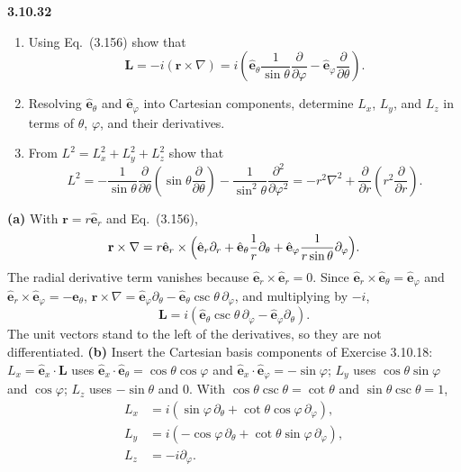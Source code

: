 \par\bigskip
\noindent\textbf{3.10.32}\quad
\begin{enumerate}
\item[(a)] Using Eq.~(3.156) show that
  \[
  \mathbf{L}=-i(\mathbf{r}\times\nabla)
  =i\left(\hat{\mathbf{e}}_{\theta}\frac{1}{\sin\theta}\frac{\partial}
  {\partial\varphi}-\hat{\mathbf{e}}_{\varphi}\frac{\partial}{\partial\theta}
  \right).
  \]
\item[(b)] Resolving $\hat{\mathbf{e}}_{\theta}$ and
  $\hat{\mathbf{e}}_{\varphi}$ into Cartesian components, determine $L_{x}$,
  $L_{y}$, and $L_{z}$ in terms of $\theta$, $\varphi$, and their derivatives.
\item[(c)] From $L^{2}=L_{x}^{2}+L_{y}^{2}+L_{z}^{2}$ show that
  \[
  L^{2}=-\frac{1}{\sin\theta}\frac{\partial}{\partial\theta}
  \left(\sin\theta\frac{\partial}{\partial\theta}\right)
  -\frac{1}{\sin^{2}\theta}\frac{\partial^{2}}{\partial\varphi^{2}}
  =-r^{2}\nabla^{2}+\frac{\partial}{\partial r}\left(r^{2}\frac{\partial}
  {\partial r}\right).
  \]
\end{enumerate}
\solution
\textbf{(a)} With $\mathbf r=r\hat{\mathbf e}_r$ and Eq.~(3.156),
\[
\mathbf r\times\nabla=r\hat{\mathbf e}_r\times\Bigl(\hat{\mathbf e}_r\partial_r
+\hat{\mathbf e}_\theta\frac1r\partial_\theta
+\hat{\mathbf e}_\varphi\frac1{r\sin\theta}\partial_\varphi\Bigr).
\]
The radial derivative term vanishes because
$\hat{\mathbf e}_r\times\hat{\mathbf e}_r=0$. Since
$\hat{\mathbf e}_r\times\hat{\mathbf e}_\theta=\hat{\mathbf e}_\varphi$
and $\hat{\mathbf e}_r\times\hat{\mathbf e}_\varphi=-\hat{\mathbf e}_\theta$,
$\mathbf r\times\nabla=\hat{\mathbf e}_\varphi\partial_\theta
-\hat{\mathbf e}_\theta\csc\theta\,\partial_\varphi$, and multiplying by $-i$,
\[
\boxed{\mathbf L=i(\hat{\mathbf e}_\theta\csc\theta\,\partial_\varphi
-\hat{\mathbf e}_\varphi\partial_\theta)}.
\]
The unit vectors stand to the left of the derivatives, so they are
not differentiated.
\textbf{(b)} Insert the Cartesian basis components of Exercise 3.10.18:
$L_x=\hat{\mathbf e}_x\cdot\mathbf L$ uses
$\hat{\mathbf e}_x\cdot\hat{\mathbf e}_\theta=\cos\theta\cos\varphi$ and
$\hat{\mathbf e}_x\cdot\hat{\mathbf e}_\varphi=-\sin\varphi$;
$L_y$ uses $\cos\theta\sin\varphi$ and $\cos\varphi$; $L_z$ uses
$-\sin\theta$ and $0$. With $\cos\theta\csc\theta=\cot\theta$ and
$\sin\theta\csc\theta=1$,
\[
\boxed{\begin{aligned}
L_x&=i(\sin\varphi\,\partial_\theta+\cot\theta\cos\varphi\,\partial_\varphi),\\
L_y&=i(-\cos\varphi\,\partial_\theta+\cot\theta\sin\varphi\,\partial_\varphi),\\
L_z&=-i\partial_\varphi.
\end{aligned}}
\]
